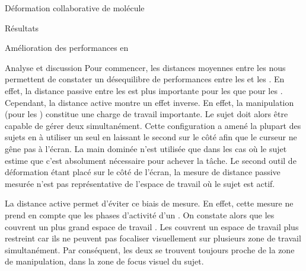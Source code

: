 \documentclass[myfrancais,ngerman,english,french]{mythesis}
\begin{document}
\begin{mychapter}{Déformation collaborative de molécule}
\begin{mysection}{Résultats}
\begin{mysubsection}{Amélioration des performances en }
\begin{mysubsubsection}{Analyse et discussion}
					Pour commencer, les distances moyennes entre les  nous permettent de constater un désequilibre de performances entre les  et les  .
					En effet, la distance passive entre les  est plus importante pour les  que pour les .
					Cependant, la distance active montre un effet inverse.
					En effet, la manipulation  (pour les ) constitue une charge de travail importante.
					Le sujet doit alors être capable de gérer deux  simultanément.
					Cette configuration a amené la plupart des sujets en  à utiliser un seul  en laissant le second sur le côté afin que le curseur ne gêne pas à l'écran.
					La main dominée n'est utilisée que dans les cas où le sujet estime que c'est absolument nécessaire pour achever la tâche.
					Le second outil de déformation étant placé sur le côté de l'écran, la mesure de distance passive mesurée n'est pas représentative de l'espace de travail où le sujet est actif.

					La distance active permet d'éviter ce biais de mesure.
					En effet, cette mesure ne prend en compte que les phases d'activité d'un .
					On constate alors que les  couvrent un plus grand espace de travail .
					Les  couvrent un espace de travail plus restreint car ils ne peuvent pas focaliser visuellement sur plusieurs zone de travail simultanément.
					Par conséquent, les deux  se trouvent toujours proche de la zone de manipulation, dans la zone de focus visuel du sujet.


\end{mysubsubsection}
\end{mysubsection}
\end{mysection}
\end{mychapter}
\end{document}
